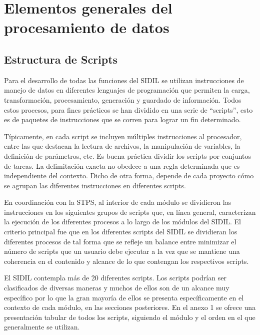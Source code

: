 \documentclass[
]{article}
\begin{document}
\hypertarget{elementosgenerales}{%
\section{Elementos generales del procesamiento de datos}\label{elementosgenerales}}

\hypertarget{estructurascripts}{%
\subsection{Estructura de Scripts}\label{estructurascripts}}

Para el desarrollo de todas las funciones del SIDIL se utilizan instrucciones de manejo de datos en diferentes lenguajes de programación que permiten la carga, transformación, procesamiento, generación y guardado de información. Todos estos procesos, para fines prácticos se han dividido en una serie de ``scripts'', esto es de paquetes de instrucciones que se corren para lograr un fin determinado.

Típicamente, en cada script se incluyen múltiples instrucciones al procesador, entre las que destacan la lectura de archivos, la manipulación de variables, la definición de parámetros, etc. Es buena práctica dividir los scripts por conjuntos de tareas. La delimitación exacta no obedece a una regla determinada que es independiente del contexto. Dicho de otra forma, depende de cada proyecto cómo se agrupan las diferentes instrucciones en diferentes scripts.

En coordinación con la STPS, al interior de cada módulo se dividieron las instrucciones en los siguientes grupos de scripts que, en línea general, caracterizan la ejecución de los diferentes procesos a lo largo de los módulos del SIDIL. El criterio principal fue que en los diferentes scripts del SIDIL se dividieran los diferentes procesos de tal forma que se refleje un balance entre minimizar el número de scripts que un usuario debe ejecutar a la vez que se mantiene una coherencia en el contenido y alcance de lo que contengan los respectivos scripts.

El SIDIL contempla más de 20 diferentes scripts. Los scripts podrían ser clasificados de diversas maneras y muchos de ellos son de un alcance muy específico por lo que la gran mayoría de ellos se presenta específicamente en el contexto de cada módulo, en las secciones posteriores. En el anexo 1 se ofrece una presentación tabular de todos los scripts, siguiendo el módulo y el orden en el que generalmente se utilizan.
\end{document}
